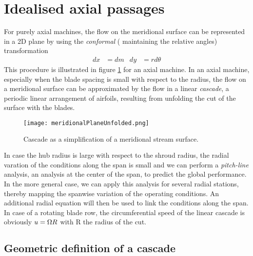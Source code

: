 \section{Idealised axial passages}
\label{sec:idealAxial}

For purely axial machines, the flow on the meridional surface can be
represented in a 2D plane by using the \emph{conformal} (\ie
maintaining the relative angles) transformation
\begin{align*}
  dx &= dm & dy &= r d \theta
\end{align*}
This procedure is illustrated in figure \ref{fig:meridionalCut} for an
axial machine. In an axial machine, especially when the blade spacing
is small with respect to the radius, the flow on a meridional surface
can be approximated by the flow in a linear \emph{cascade}, \ie a
periodic linear arrangement of airfoils, resulting from unfolding the
cut of the surface with the blades.
\begin{figure}[!h]
  \centering
  \texttt{[image: meridionalPlaneUnfolded.png]}
  \caption{Cascade as a simplification of a meridional stream surface.}
  \label{fig:meridionalCut}
\end{figure}
In case the hub radius is large with respect to the shroud radius, the
radial varation of the conditions along the span is small and we can
perform a \emph{pitch-line} analysis, \ie an analysis at the center of
the span, to predict the global performance. In the more general case,
we can apply this analysis for several radial stations, thereby
mapping the spanwise variation of the operating conditions. An
additional radial equation will then be used to link the conditions
along the span. In case of a rotating blade row, the circumferential
speed of the linear cascade is obviously $u = \Omega R$ with R the
radius of the cut.


\subsection{Geometric definition of a cascade}
\label{sec:cascadeGeometry}

